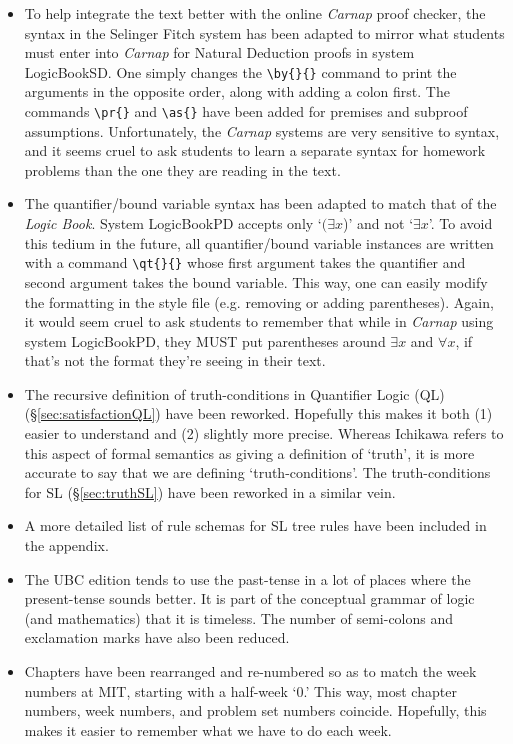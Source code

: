 \begin{itemize}
\item To help integrate the text better with the online \textit{Carnap} proof checker, the syntax in the Selinger Fitch system has been adapted to mirror what students must enter into \textit{Carnap} for Natural Deduction proofs in system LogicBookSD.
  One simply changes the \verb|\by{}{}| command to print the arguments in the opposite order, along with adding a colon first.
  The commands \verb|\pr{}| and \verb|\as{}| have been added for premises and subproof assumptions.
  Unfortunately, the \textit{Carnap} systems are very sensitive to syntax, and it seems cruel to ask students to learn a separate syntax for homework problems than the one they are reading in the text. %

\item The quantifier/bound variable syntax has been adapted to match that of the \textit{Logic Book}.
  System LogicBookPD accepts only `$(\exists x$)' and not `$\exists x$'.
  To avoid this tedium in the future, all quantifier/bound variable instances are written with a command \verb|\qt{}{}| whose first argument takes the quantifier and second argument takes the bound variable.
  This way, one can easily modify the formatting in the style file (e.g. removing or adding parentheses).
  Again, it would seem cruel to ask students to remember that while in \textit{Carnap} using system LogicBookPD, they MUST put parentheses around $\exists x$ and $\forall x$, if that's not the format they're seeing in their text.

\item The recursive definition of truth-conditions in Quantifier Logic (QL) (\S\ref{sec:satisfactionQL}) have been reworked.
  Hopefully this makes it both (1) easier to understand and (2) slightly more precise.
  Whereas Ichikawa refers to this aspect of formal semantics as giving a definition of `truth', it is more accurate to say that we are defining `truth-conditions'.
  The truth-conditions for SL (\S\ref{sec:truthSL}) have been reworked in a similar vein.

\item A more detailed list of rule schemas for SL tree rules have been included in the appendix. 

\item The UBC edition tends to use the past-tense in a lot of places where the present-tense sounds better.
  It is part of the conceptual grammar of logic (and mathematics) that it is timeless. 
  The number of semi-colons and exclamation marks have also been reduced.

\item Chapters have been rearranged and re-numbered so as to match the week numbers at MIT, starting with a half-week `0.'
  This way, most chapter numbers, week numbers, and problem set numbers coincide.
  Hopefully, this makes it easier to remember what we have to do each week.

\end{itemize}

